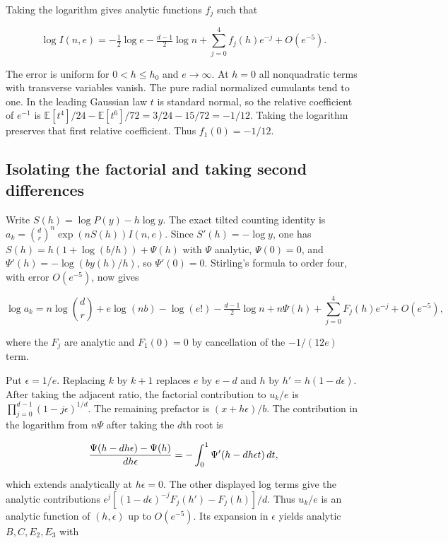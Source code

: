 \documentclass[11pt]{article}
\begin{document}
Taking the logarithm gives analytic functions $f_j$ such that

\begin{equation*}
\log I(n,e)=-\tfrac12\log e-\tfrac{d-1}2\log n
+\sum_{j=0}^4 f_j(h)e^{-j}+O(e^{-5}).
\end{equation*}

The error is uniform for $0<h\le h_0$ and $e\to\infty$. At $h=0$ all nonquadratic terms with transverse variables vanish. The pure radial normalized cumulants tend to one. In the leading Gaussian law $t$ is standard normal, so the relative coefficient of $e^{-1}$ is $\mathbb E[t^4]/24-\mathbb E[t^6]/72=3/24-15/72=-1/12$. Taking the logarithm preserves that first relative coefficient. Thus $f_1(0)=-1/12$.

\subsection{Isolating the factorial and taking second differences}

Write $S(h)=\log P(y)-h\log y$. The exact tilted counting identity is
$a_k=\binom{d}{r}^{n}\exp(n S(h))I(n,e)$. Since $S'(h)=-\log y$, one has
$S(h)=h(1+\log(b/h))+\Psi(h)$ with $\Psi$ analytic, $\Psi(0)=0$, and
$\Psi'(h)=-\log(by(h)/h)$, so $\Psi'(0)=0$. Stirling's formula to order four, with error $O(e^{-5})$, now gives

\begin{equation*}
\log a_k=n\log\binom dr+e\log(nb)-\log(e!)
-\tfrac{d-1}2\log n+n\Psi(h)
+\sum_{j=0}^4 F_j(h)e^{-j}+O(e^{-5}),
\end{equation*}

where the $F_j$ are analytic and $F_1(0)=0$ by cancellation of the $-1/(12e)$ term.

Put $\epsilon=1/e$. Replacing $k$ by $k+1$ replaces $e$ by $e-d$ and $h$ by $h'=h(1-d\epsilon)$. After taking the adjacent ratio, the factorial contribution to $u_k/e$ is $\prod_{j=0}^{d-1}(1-j\epsilon)^{1/d}$. The remaining prefactor is $(x+h\epsilon)/b$. The contribution in the logarithm from $n\Psi$ after taking the $d$th root is

\begin{equation*}
\frac{\Psi(h-dh\epsilon)-\Psi(h)}{d h\epsilon}
=-\int_0^1 \Psi'(h-dh\epsilon t)\thinspace dt,
\end{equation*}

which extends analytically at $h\epsilon=0$. The other displayed log terms give the analytic contributions $\epsilon^j[(1-d\epsilon)^{-j}F_j(h')-F_j(h)]/d$. Thus $u_k/e$ is an analytic function of $(h,\epsilon)$ up to $O(e^{-5})$. Its expansion in $\epsilon$ yields analytic $B,C,E_2,E_3$ with
\end{document}
